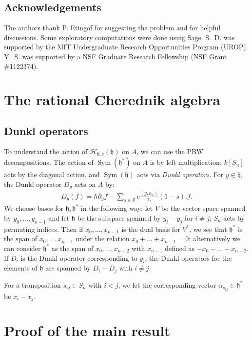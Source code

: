 \documentclass{amsart}
\numberwithin{equation}{section}
\theoremstyle{definition}
\newcommand{\h}{\mathfrak{h}}
\newcommand{\HH}{\mathcal{H}}
\newcommand{\Sym}{\operatorname{Sym}}
\begin{document}
\subsection{Acknowledgements} 

The authors thank P. Etingof for suggesting the problem and for helpful discussions.  Some exploratory computations were done using Sage.  S.~D. was supported by the MIT Undergraduate Research Opportunities Program (UROP). Y.~S. was supported by a NSF Graduate Research Fellowship (NSF Grant \#1122374).


\section{The rational Cherednik algebra}
 
\subsection{Dunkl operators}

To understand the action of $\HH_{\hbar,c}(\h)$ on $A$, we can use the PBW decompositions. The action of $\Sym(\h^*)$ on $A$ is by left multiplication; $k[S_n]$ acts by the diagonal action, and $\Sym(\h)$ acts via {\it Dunkl operators}. For $y \in \h$, the Dunkl operator $D_y$ acts on $A$ by:
\begin{align*}
D_y(f) = \hbar \partial_y f  - \sum_{s \in \mathcal{S}} c \frac{ ( y, \alpha_s )}{\alpha_s} (1-s). f.
\end{align*}
We choose bases for $\h,\h^*$ in the following way: let $V$ be the vector space spanned by $y_0,\dots,y_{n-1}$ and let $\h$ be the subspace spanned by $y_i-y_j$ for $i \ne j$; $S_n$ acts by permuting indices. Then if $x_0,\dots,x_{n-1}$ is the dual basis for $V^*$, we see that $\h^*$ is the span of $x_0,\dots,x_{n-1}$ under the relation $x_0+\dots+x_{n-1}=0$; alternatively we can consider $\h^*$ as the span of $x_0,\dots,x_{n-2}$ with $x_{n-1}$ defined as $-x_0-\dots-x_{n-2}$.  If $D_i$ is the Dunkl operator corresponding to $y_i$, the Dunkl operators for the elements of $\h$ are spanned by $D_i-D_j$ with $i \ne j$. 

For a transposition $s_{ij} \in S_n$ with $i<j$, we let the corresponding vector $\alpha_{s_{ij}} \in \h^*$ be $x_i-x_j$.

\section{Proof of the main result}
\end{document}
